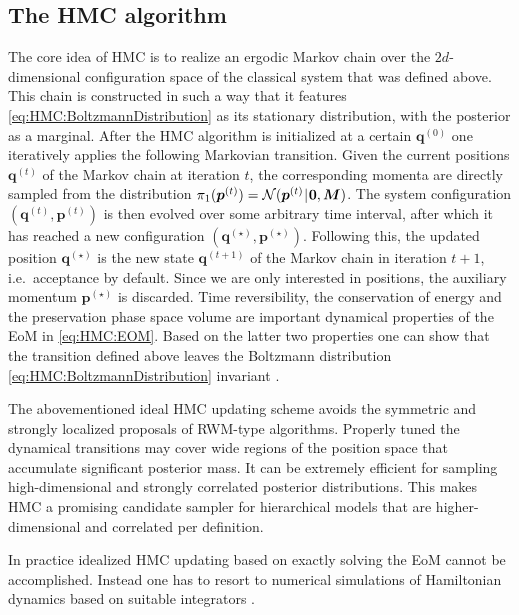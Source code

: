 \subsection{The HMC algorithm}
The core idea of HMC is to realize an ergodic Markov chain over the \(2d\)-dimensional configuration space of the classical system that was defined above.
This chain is constructed in such a way that it features \cref{eq:HMC:BoltzmannDistribution} as its stationary distribution, with the posterior as a marginal.
After the HMC algorithm is initialized at a certain \(\bm{q}^{(0)}\) one iteratively applies the following Markovian transition.
Given the current positions \(\bm{q}^{(t)}\) of the Markov chain at iteration \(t\),
the corresponding momenta are directly sampled from the distribution \(\pi_1(\bm{p}^{(t)}) = \mathcal{N}(\bm{p}^{(t)} {\:\!}|{\:\!} \bm{0},\bm{M})\).
The system configuration \((\bm{q}^{(t)},\bm{p}^{(t)})\) is then evolved over some arbitrary time interval, after which it has reached a new configuration \((\bm{q}^{(\star)},\bm{p}^{(\star)})\).
Following this, the updated position \(\bm{q}^{(\star)}\) is the new state \(\bm{q}^{(t+1)}\) of the Markov chain in iteration \(t+1\), i.e.\ acceptance by default.
Since we are only interested in positions, the auxiliary momentum \(\bm{p}^{(\star)}\) is discarded.
Time reversibility, the conservation of energy and the preservation phase space volume are important dynamical properties of the EoM in \cref{eq:HMC:EOM}.
Based on the latter two properties one can show that the transition defined above leaves the Boltzmann distribution \cref{eq:HMC:BoltzmannDistribution} invariant \cite{MCMC:SanzSerna2014}.
\par %
The abovementioned ideal HMC updating scheme avoids the symmetric and strongly localized proposals of RWM-type algorithms.
Properly tuned the dynamical transitions may cover wide regions of the position space that accumulate significant posterior mass.
It can be extremely efficient for sampling high-dimensional and strongly correlated posterior distributions.
This makes HMC a promising candidate sampler for hierarchical models that are higher-dimensional and correlated per definition.
\par %
In practice idealized HMC updating based on exactly solving the EoM cannot be accomplished.
Instead one has to resort to numerical simulations of Hamiltonian dynamics based on suitable integrators \cite{Physics:Sanz-Serna1994,Physics:Leimkuhler2004}.
